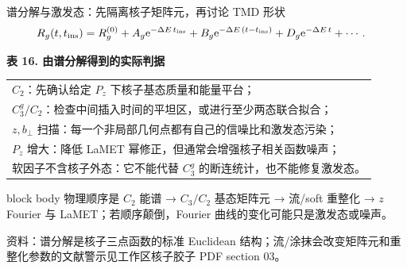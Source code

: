 \documentclass[UTF8,aspectratio=169,11pt]{ctexbeamer}
\newcommand{\source}[1]{%
  \par\vspace{-0.08em}%
  \noindent\parbox[t]{0.97\linewidth}{\raggedright\scriptsize\color{muted}资料：#1}\par}
\newcommand{\e}{\mathrm{e}}
\begin{document}
\begin{frame}[t]{谱分解与激发态：先隔离核子矩阵元，再讨论 TMD 形状}
  \begin{align*}
    R_g(t,t_{\rm ins})
    &=R_g^{(0)}
      +A_g\e^{-\Delta E\,t_{\rm ins}}
      +B_g\e^{-\Delta E\,(t-t_{\rm ins})}
      +D_g\e^{-\Delta E\,t}+\cdots .
  \end{align*}
  \begin{center}
  \textbf{表 16. 由谱分解得到的实际判据}
  \vspace{0.12em}
  \begin{tabular}{@{}p{\linewidth}@{}}
    \toprule
    $C_2$：先确认给定 $P_z$ 下核子基态质量和能量平台；\\
    $C_3^g/C_2$：检查中间插入时间的平坦区，或进行至少两态联合拟合；\\
    $z,b_\perp$ 扫描：每一个非局部几何点都有自己的信噪比和激发态污染；\\
    $P_z$ 增大：降低 LaMET 幂修正，但通常会增强核子相关函数噪声；\\
    软因子不含核子外态：它不能代替 $C_3^g$ 的断连统计，也不能修复激发态。\\
    \bottomrule
  \end{tabular}
  \end{center}
  \begin{beamercolorbox}[wd=0.96\textwidth,sep=0.45em,rounded=true]{block body}
    物理顺序是 $C_2$ 能谱 → $C_3/C_2$ 基态矩阵元 → 流/soft 重整化 → $z$ Fourier 与 LaMET；若顺序颠倒，Fourier 曲线的变化可能只是激发态或噪声。
  \end{beamercolorbox}
  \source{谱分解是核子三点函数的标准 Euclidean 结构；流/涂抹会改变矩阵元和重整化参数的文献警示见工作区核子胶子 PDF section 03。}
\end{frame}
\end{document}
